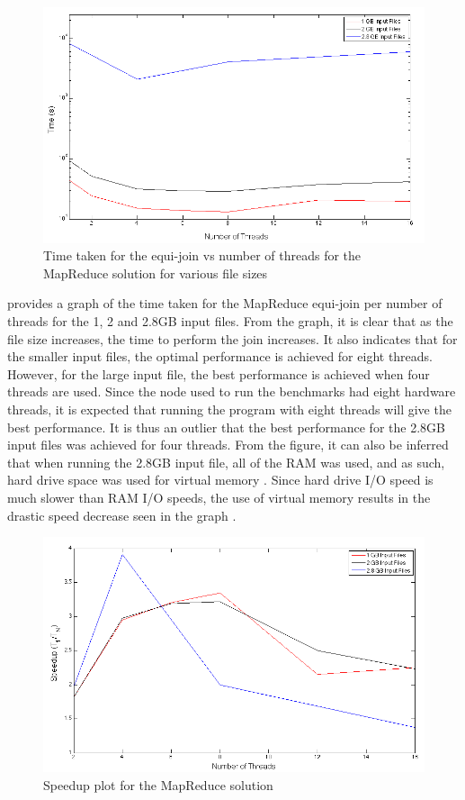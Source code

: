 \documentclass[11pt,twocolumn]{witseiepaper}
\begin{document}
\begin{figure}[h]
	\centering
	\includegraphics[width=1\columnwidth]{mapReduceTimevsThreads.png}
	\caption{Time taken for the equi-join vs number of threads for the MapReduce solution for various file sizes}
	\raggedright
	\label{fig:resultsMR}	
\end{figure}

 provides a graph of the time taken for the MapReduce equi-join per number of threads for the 1, 2 and 2.8GB input files. From the graph, it is clear that as the file size increases, the time to perform the join increases. It also indicates that for the smaller input files, the optimal performance is achieved for eight threads. However, for the large input file, the best performance is achieved when four threads are used. Since the node used to run the benchmarks had eight hardware threads, it is expected that running the program with eight threads will give the best performance. It is thus an outlier that the best performance for the 2.8GB input files was achieved for four threads. From the figure, it can also be inferred that when running the 2.8GB input file, all of the RAM was used, and as such, hard drive space was used for virtual memory \cite{ram}. Since hard drive I/O speed is much slower than RAM I/O speeds, the use of virtual memory results in the drastic speed decrease seen in the graph \cite{ram}.


\begin{figure}[h]
	\centering
	\includegraphics[width=1\columnwidth]{mapReduceSpeedup.png}
	\caption{Speedup plot for the MapReduce solution}
	\raggedright
	\label{fig:speedUpMR}	
\end{figure}
\end{document}
